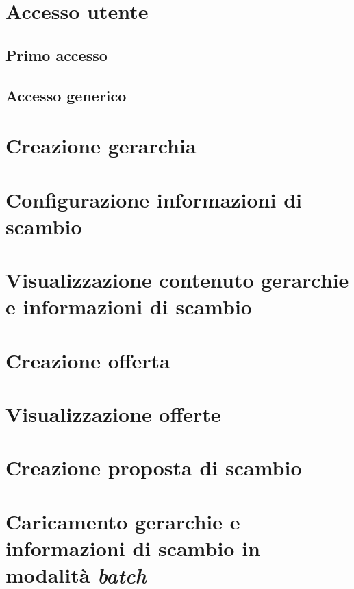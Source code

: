 \section{Accesso utente}

\subsection{Primo accesso}


\subsection{Accesso generico}

\section{Creazione gerarchia}

\section{Configurazione informazioni di scambio}

\section{Visualizzazione contenuto gerarchie e informazioni di scambio}

\section{Creazione offerta}

\section{Visualizzazione offerte}

\section{Creazione proposta di scambio}

\section{Caricamento gerarchie e informazioni di scambio in modalità \textit{batch}}